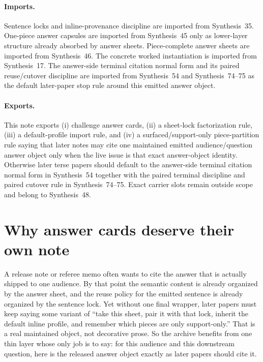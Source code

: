 \documentclass[11pt]{article}
\begin{document}
\paragraph{Imports.}
Sentence locks and inline-provenance discipline are imported from Synthesis~35.\cite{series:sentencelocks}
One-piece answer capsules are imported from Synthesis~45 only as lower-layer structure already absorbed by answer sheets.\cite{series:challengeanswercapsules}
Piece-complete answer sheets are imported from Synthesis~46.\cite{series:challengeanswersheets}
The concrete worked instantiation is imported from Synthesis~17.\cite{series:workedexample}
The answer-side terminal citation normal form and its paired reuse/cutover discipline are imported from Synthesis~54 and Synthesis~74--75 as the default later-paper stop rule around this emitted answer object.\cite{series:challengeanswerreviewmenus,series:pairedterminalcitationdiscipline,series:pairedterminalcutoverrules}

\paragraph{Exports.}
This note exports (i) challenge answer cards, (ii) a sheet-lock factorization rule, (iii) a default-profile import rule, and (iv) a surfaced/support-only piece-partition rule saying that later notes may cite one maintained emitted audience/question answer object only when the live issue is that exact answer-object identity.
Otherwise later terse papers should default to the answer-side terminal citation normal form in Synthesis~54 together with the paired terminal discipline and paired cutover rule in Synthesis~74--75. Exact carrier slots remain outside scope and belong to Synthesis~48.\cite{series:challengeanswerreviewmenus,series:pairedterminalcitationdiscipline,series:pairedterminalcutoverrules}

\section{Why answer cards deserve their own note}
A release note or referee memo often wants to cite the answer that is actually shipped to one audience.
By that point the semantic content is already organized by the answer sheet, and the reuse policy for the emitted sentence is already organized by the sentence lock.
Yet without one final wrapper, later papers must keep saying some variant of ``take this sheet, pair it with that lock, inherit the default inline profile, and remember which pieces are only support-only.''
That is a real maintained object, not decorative prose.
So the archive benefits from one thin layer whose only job is to say: for this audience and this downstream question, here is the released answer object exactly as later papers should cite it.
\end{document}
